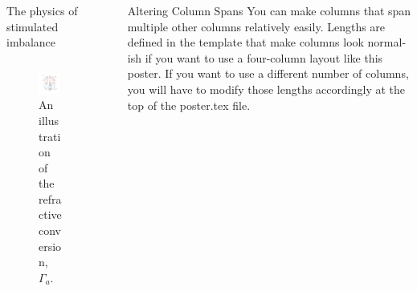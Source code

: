 \documentclass[final]{beamer}
\newlength{\sepwid}
\begin{document}
\begin{frame}[t]
\begin{columns}[t]
\begin{column}{0.4\paperwidth}
\begin{alertblock}{The physics of stimulated imbalance}
\begin{columns}
                \begin{column}{0.425\textwidth}
                  \begin{figure}
                    \includegraphics[width=0.9\textwidth]{figs/Gammar.pdf}
                    \caption{An illustration of the refractive conversion,
                              $\Gamma_a$.}
                  \end{figure}
                \end{column}

                \end{columns}
      \end{alertblock}


    \end{column}




    \begin{column}{\sepwid}\end{column}			%
    \begin{column}{0.475\paperwidth}					  %
      \begin{block}{Altering Column Spans}
        You can make columns that span multiple other columns relatively easily. Lengths are defined in the template that make columns look normal-ish if you want to use a four-column layout like this poster. If you want to use a different number of columns, you will have to modify those lengths accordingly at the top of the poster.tex file.


\end{block}
\end{column}
\end{columns}
\end{frame}
\end{document}
